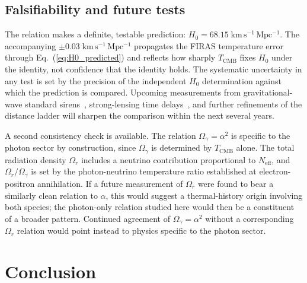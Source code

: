 \documentclass[12pt, a4paper]{article}
\begin{document}
\subsection{Falsifiability and future tests}
\label{sec:falsifiability}

The relation makes a definite, testable prediction: $H_0 = 68.15\;\mathrm{km\,s^{-1}\,Mpc^{-1}}$. The accompanying $\pm 0.03\;\mathrm{km\,s^{-1}\,Mpc^{-1}}$ propagates the FIRAS temperature error through Eq.~(\ref{eq:H0_predicted}) and reflects how sharply $T_{\mathrm{CMB}}$ fixes $H_0$ under the identity, not confidence that the identity holds. The systematic uncertainty in any test is set by the precision of the independent $H_0$ determination against which the prediction is compared. Upcoming measurements from gravitational-wave standard sirens~\cite{ligo_standard_siren}, strong-lensing time delays~\cite{tdcosmo}, and further refinements of the distance ladder will sharpen the comparison within the next several years.

A second consistency check is available. The relation $\Omega_\gamma = \alpha^2$ is specific to the photon sector by construction, since $\Omega_\gamma$ is determined by $T_{\mathrm{CMB}}$ alone. The total radiation density $\Omega_r$ includes a neutrino contribution proportional to $N_{\mathrm{eff}}$, and $\Omega_r/\Omega_\gamma$ is set by the photon-neutrino temperature ratio established at electron-positron annihilation. If a future measurement of $\Omega_r$ were found to bear a similarly clean relation to $\alpha$, this would suggest a thermal-history origin involving both species; the photon-only relation studied here would then be a constituent of a broader pattern. Continued agreement of $\Omega_\gamma = \alpha^2$ without a corresponding $\Omega_r$ relation would point instead to physics specific to the photon sector.

\section{Conclusion}
\label{sec:conclusion}
\end{document}
